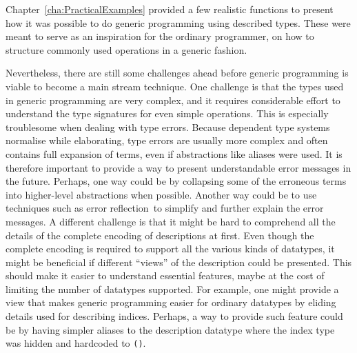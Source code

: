 \documentclass{ituthesis}
\newcommand{\tttype}[1]{\textcolor{type-color}{\texttt{#1}}}
\theoremstyle{break}
\begin{document}
Chapter~\ref{cha:PracticalExamples} provided a few realistic functions to present how it was possible to do generic programming using described types.
These were meant to serve as an inspiration for the ordinary programmer, on how to structure commonly used operations in a generic fashion.

Nevertheless, there are still some challenges ahead before generic programming is viable to become a main stream technique.
One challenge is that the types used in generic programming are very complex, and it requires considerable effort to understand the type signatures for even simple operations.
This is especially troublesome when dealing with type errors. 
Because dependent type systems normalise while elaborating, type errors are usually more complex and often contains full expansion of terms, even if abstractions like aliases were used.
It is therefore important to provide a way to present understandable error messages in the future.
Perhaps, one way could be by collapsing some of the erroneous terms into higher-level abstractions when possible.
Another way could be to use techniques such as error reflection\,\autocite{christiansen2014reflect} to simplify and further explain the error messages.
A different challenge is that it might be hard to comprehend all the details of the complete encoding of descriptions at first.
Even though the complete encoding is required to support all the various kinds of datatypes, it might be beneficial if different ``views'' of the description could be presented.
This should make it easier to understand essential features, maybe at the cost of limiting the number of datatypes supported.
For example, one might provide a view that makes generic programming easier for ordinary datatypes by eliding details used for describing indices.
Perhaps, a way to provide such feature could be by having simpler aliases to the description datatype where the index type was hidden and hardcoded to \tttype{()}.


\end{document}
